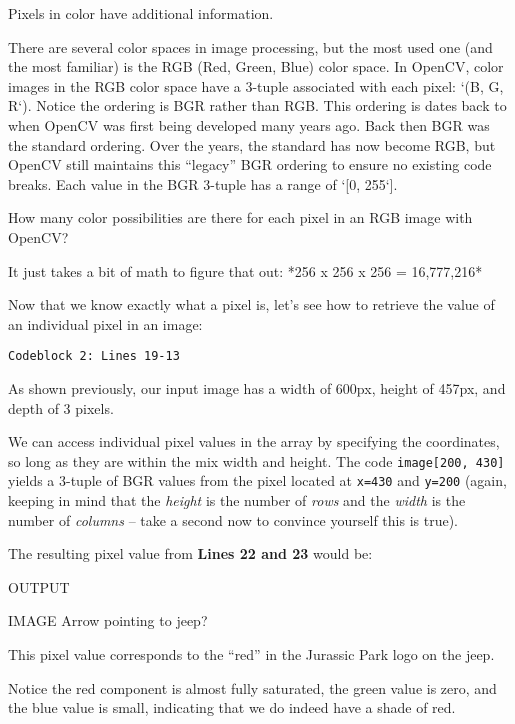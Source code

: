 Pixels in color have additional information.

There are several color spaces in image processing, but the most used one (and the most familiar) is the RGB (Red, Green, Blue) color space. In OpenCV, color images in the RGB color space have a 3-tuple associated with each pixel: `(B, G, R`). Notice the ordering is BGR rather than RGB. This ordering is dates back to when OpenCV was first being developed many years ago. Back then BGR was the standard ordering. Over the years, the standard has now become RGB, but OpenCV still maintains this “legacy” BGR ordering to ensure no existing code breaks. Each value in the BGR 3-tuple has a range of `[0, 255`].

How many color possibilities are there for each pixel in an RGB image with OpenCV?

It just takes a bit of math to figure that out:
*256 x 256 x 256 = 16,777,216*

Now that we know exactly what a pixel is, let’s see how to retrieve the value of an individual pixel in an image:

\begin{verbatim}
Codeblock 2: Lines 19-13
\end{verbatim}

As shown previously, our input image has a width of 600px, height of 457px, and depth of 3 pixels.

We can access individual pixel values in the array by specifying the coordinates, so long as they are within the mix width and height. The code \texttt{image[200, 430]} yields a 3-tuple of BGR values from the pixel located at \texttt{x=430} and \texttt{y=200} (again, keeping in mind that the \textit{height} is the number of \textit{rows} and the \textit{width} is the number of \textit{columns} -- take a second now to convince yourself this is true).

The resulting pixel value from \textbf{Lines 22 and 23} would be:

OUTPUT

IMAGE Arrow pointing to jeep?

This pixel value corresponds to the “red” in the Jurassic Park logo on the jeep.

Notice the red component is almost fully saturated, the green value is zero, and the blue value is small, indicating that we do indeed have a shade of red.


